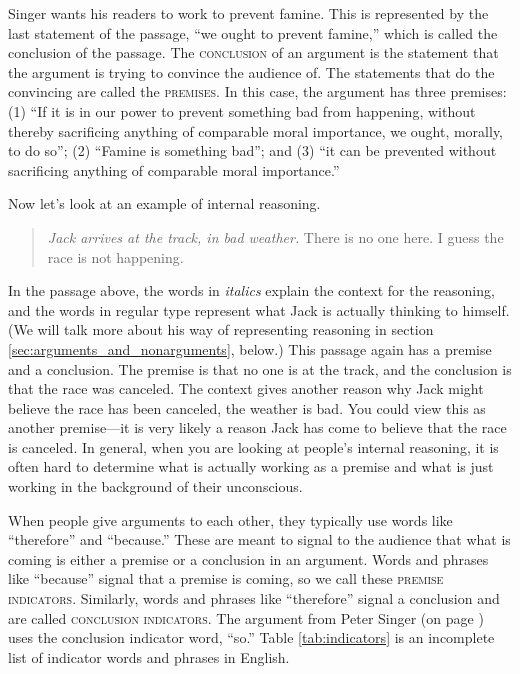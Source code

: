 Singer wants his readers to work to prevent famine. This is represented by the last statement of the passage, ``we ought to prevent famine,'' which is called the conclusion of the passage. The \textsc{\gls{conclusion}} of an argument is the statement that the argument is trying to convince the audience of. The statements that do the convincing are called the \textsc{\glspl{premise}}. In this case, the argument has three premises: (1) ``If it is in our power to prevent something bad from happening, without thereby sacrificing anything of comparable moral importance, we ought, morally, to do so''; (2) ``Famine is something bad''; and (3) ``it can be prevented without sacrificing anything of comparable moral importance.''

Now let's look at an example of internal reasoning.

\begin{quotation}
	\noindent\textit{Jack arrives at the track, in bad weather.} There is no one here. I guess the race is not happening. \label{racetrack}
\end{quotation}

In the passage above, the words in \textit{italics} explain the context for the reasoning, and the words in regular type represent what Jack is actually thinking to himself.
(We will talk more about his way of representing reasoning in section \ref{sec:arguments_and_nonarguments}, below.)
This passage again has a premise and a conclusion. The premise is that no one is at the track, and the conclusion is that the race was canceled. The context gives another reason why Jack might believe the race has been canceled, the weather is bad. You could view this as another premise---it is very likely a reason Jack has come to believe that the race is canceled. In general, when you are looking at people's internal reasoning, it is often hard to determine what is actually working as a premise and what is just working in the background of their unconscious.


When people give arguments to each other, they typically use words like ``therefore'' and ``because.'' These are meant to signal to the audience that what is coming is either a premise or a conclusion in an argument. Words and phrases like ``because'' signal that a premise is coming, so we call these \textsc{\glspl{premise indicator}}. Similarly, words and phrases like ``therefore'' signal a conclusion and are called \textsc{\glspl{conclusion indicator}}. The argument from Peter Singer (on page \pageref{singer_quote}) uses the conclusion indicator word, ``so.'' Table \ref{tab:indicators} is an incomplete list of indicator words and phrases in English.


